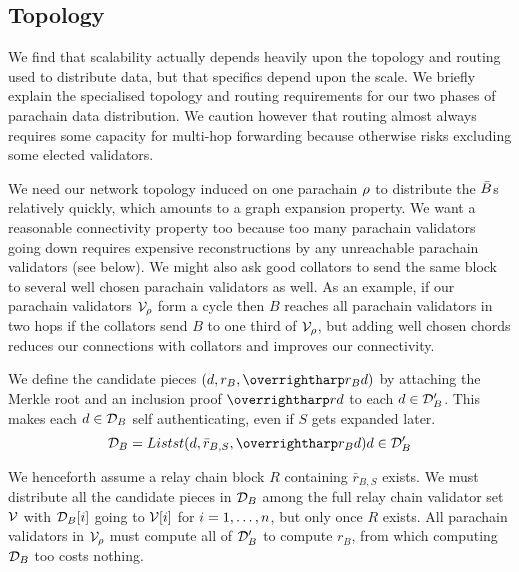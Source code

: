 \subsection{Topology} 

We find that scalability actually depends heavily upon the topology and routing used to distribute data, but that specifics depend upon the scale.  We briefly explain the specialised topology and routing requirements for our two phases of parachain data distribution.  We caution however that routing almost always requires some capacity for multi-hop forwarding because otherwise risks excluding some elected validators.  

\smallskip

We need our network topology induced on one parachain $\rho$ to distribute the $\bar{B}$s relatively quickly, which amounts to a graph expansion property.  We want a reasonable connectivity property too because too many parachain validators going down requires expensive reconstructions by any unreachable parachain validators (see  below).  We might also ask good collators to send the same block to several well chosen parachain validators as well.  As an example, if our parachain validators $\mathcal{V}_{\rho}$ form a cycle then $B$ reaches all parachain validators in two hops if the collators send $B$ to one third of $\mathcal{V}_{\rho}$, but adding well chosen chords reduces our connections with collators and improves our connectivity.  

\smallskip

We define the candidate pieces $(d,r_B,\vect{r_B d})$ by attaching the Merkle root and an inclusion proof $\vect{rd}$ to each $d \in \mathcal{D}'_B$.  This makes each $d \in \mathcal{D}_B$ self authenticating, even if $S$ gets expanded later.
$$ \pieces_B = Listst{ (d,\bar{r}_{B,S},\vect{r_B d}) }{ d \in \pieces'_B } $$

We henceforth assume a relay chain block $R$ containing $\bar{r}_{B,S}$ exists.  We must distribute all the candidate pieces in $\mathcal{D}_B$ among the full relay chain validator set $\mathcal{V}$ with $\mathcal{D}_B[i]$ going to $\mathcal{V}[i]$ for $i = 1,\ldots,n$, but only once $R$ exists.  All parachain validators in $\mathcal{V}_{\rho}$ must compute all of $\mathcal{D}'_B$ to compute $r_B$, from which computing $\mathcal{D}_B$ too costs nothing.  

